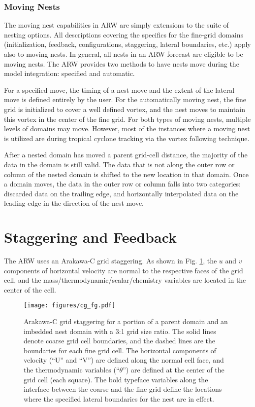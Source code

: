 \subsubsection{Moving Nests}

The moving nest capabilities in ARW are simply extensions to the 
suite of nesting options.  All descriptions covering the 
specifics for the fine-grid
domains (initialization, feedback, configurations, staggering,
lateral boundaries, etc.) apply also to moving nests.  In
general, all nests
in an ARW forecast are eligible to be moving nests.  The ARW
provides two methods to have nests move during the model
integration: specified and automatic.

For a specified move, the timing of a nest move and the extent
of the lateral move is defined entirely by the user.  For the
automatically moving nest, the fine grid is initialized to cover
a well defined vortex, and the nest moves to maintain this vortex
in the center of the fine grid.  For both types of moving nests,
multiple levels of domains may move.  However, most of the 
instances where a moving nest is utilized are during tropical
cyclone tracking via the vortex following technique.  

After a nested domain has moved a parent grid-cell distance,
the majority of the data in the domain is still valid.  The
data that is not along the outer row or column of the nested
domain is shifted to the new location in that domain.  
Once a domain moves, the data in the outer
row or column falls into two categories: discarded data on the
trailing edge, and horizontally interpolated data on the
leading edge in the direction of the nest move.  

\section{Staggering and Feedback}

The ARW uses an Arakawa-C grid staggering.  As shown in Fig.
\ref{figure:cg_fg}, the $u$ and $v$ components 
of horizontal velocity are normal to the respective faces of the 
grid cell, and the mass/thermodynamic/scalar/chemistry variables are located 
in the center of the cell.   

%
%
\begin{figure}
  \centering
  \texttt{[image: figures/cg\_fg.pdf]}
  \caption{\label{figure:cg_fg}
Arakawa-C grid staggering for a portion of a parent domain and an
imbedded nest domain with a 3:1 grid size ratio.  The solid lines
denote coarse grid cell boundaries, and the dashed lines are the
boundaries for each fine grid cell.  The horizontal components of
velocity (``U'' and ``V'') are defined along the normal cell face, and
the thermodynamic variables (``$\theta$'') are defined at the center of
the grid cell (each square).  The bold typeface variables along the
interface between the coarse and the fine grid define the locations
where the specified lateral boundaries for the nest are in
effect.  } \end{figure}


